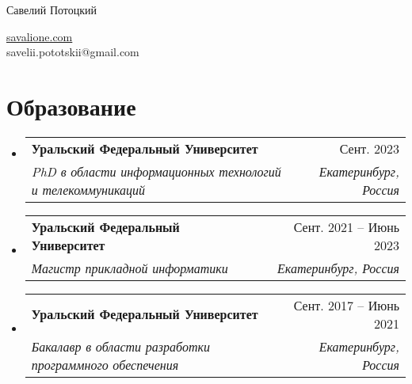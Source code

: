 \documentclass[a4paper,11pt]{article}
\makeatletter
\newcommand{\resumeItem}[1]{
    \item{
                {#1 \vspace{-4pt}}
          }
}
\newcommand{\resumeSubheading}[4]{
    \vspace{-2pt}\item
    \begin{tabular*}{0.97\textwidth}[t]{l@{\extracolsep{\fill}}r}
        \textbf{#1} & #2 \\
        \textit{\small #3} & \textit{\small #4} \\
    \end{tabular*}\vspace{-10pt}
}
\newcommand{\resumeSubHeadingListStart}{\begin{itemize}[leftmargin=0.15in, label={}]}
\newcommand{\resumeSubHeadingListEnd}{\end{itemize}}
\newcommand{\resumeItemListStart}{\begin{itemize}}
\newcommand{\resumeItemListEnd}{\end{itemize}\vspace{-2pt}}
\makeatother
\begin{document}
\begin{center}
    {\LARGE Савелий Потоцкий} \\ \vspace{0pt}
    \begin{multicols}{2}
        \begin{flushleft}
        \end{flushleft}

        \begin{flushright}
            \href{https://savalione.com}{savalione.com} \\

            \href{mailto:{savelii.pototskii@gmail.com}} \large{savelii.pototskii@gmail.com}
        \end{flushright}
    \end{multicols}
\end{center}

\section{Образование}
\resumeSubHeadingListStart

\resumeSubheading
    {Уральский Федеральный Университет}{Сент. 2023}
    {PhD в области информационных технологий и телекоммуникаций}{Екатеринбург, Россия}
\resumeSubheading
    {Уральский Федеральный Университет}{Сент. 2021 -- Июнь 2023}
    {Магистр прикладной информатики}{Екатеринбург, Россия}
\resumeSubheading
    {Уральский Федеральный Университет}{Сент. 2017 -- Июнь 2021}
    {Бакалавр в области разработки программного обеспечения}{Екатеринбург, Россия}

\resumeSubHeadingListEnd


\end{document}
